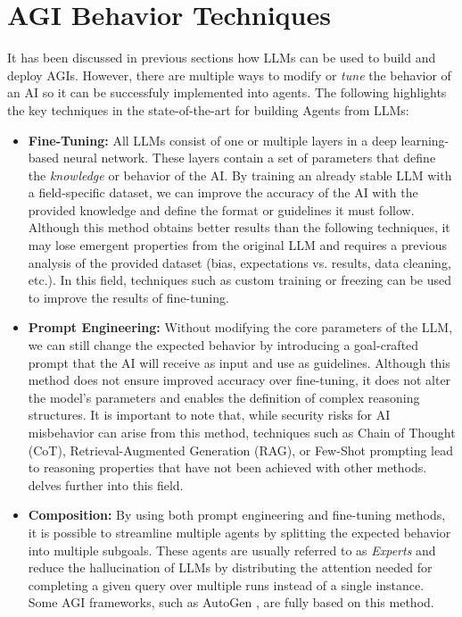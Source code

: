 
\section{AGI Behavior Techniques}
It has been discussed in previous sections how LLMs can be used to build and
deploy AGIs. However, there are multiple ways to modify or \emph{tune} the
behavior of an AI so it can be successfuly implemented into agents. The
following highlights the key techniques in the state-of-the-art for building
Agents from LLMs:


\begin{itemize}
    \item \textbf{Fine-Tuning:} All LLMs consist of one or multiple layers in a
    deep learning-based neural network. These layers contain a set of parameters
    that define the \textit{knowledge} or behavior of the AI. By training an
    already stable LLM with a field-specific dataset, we can improve the
    accuracy of the AI with the provided knowledge and define the format or
    guidelines it must follow. Although this method obtains better results than
    the following techniques, it may lose emergent properties from the original
    LLM and requires a previous analysis of the provided dataset (bias,
    expectations vs.  results, data cleaning, etc.). In this field, techniques
    such as custom training or freezing can be used to improve the results of
    fine-tuning.

    \item \textbf{Prompt Engineering:} Without modifying the core parameters of
    the LLM, we can still change the expected behavior by introducing a
    goal-crafted prompt that the AI will receive as input and use as guidelines.
    Although this method does not ensure improved accuracy over fine-tuning, it
    does not alter the model's parameters and enables the definition of complex
    reasoning structures. It is important to note that, while security risks for
    AI misbehavior can arise from this method, techniques such as Chain of
    Thought (CoT), Retrieval-Augmented Generation (RAG), or Few-Shot prompting
    lead to reasoning properties that have not been achieved with other methods.
    \cite{sahoo2024systematic} delves further into this field.

    \item \textbf{Composition:} By using both prompt engineering and fine-tuning
    methods, it is possible to streamline multiple agents by splitting the
    expected behavior into multiple subgoals. These agents are usually referred
    to as \textit{Experts} and reduce the hallucination of LLMs by distributing
    the attention needed for completing a given query over multiple runs instead
    of a single instance. Some AGI frameworks, such as AutoGen
    \cite{wu2023autogen}, are fully based on this method.


\end{itemize}
